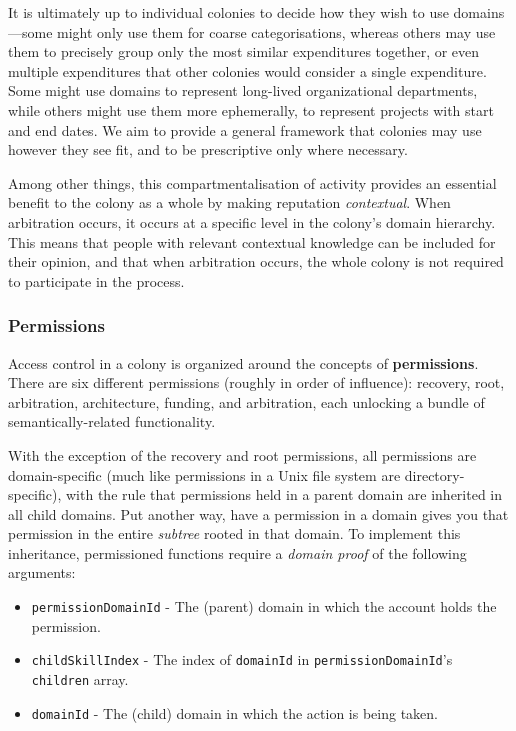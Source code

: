 It is ultimately up to individual colonies to decide how they wish to use domains—some might only use them for coarse categorisations, whereas others may use them to precisely group only the most similar expenditures together, or even multiple expenditures that other colonies would consider a single expenditure. Some might use domains to represent long-lived organizational departments, while others might use them more ephemerally, to represent projects with start and end dates. We aim to provide a general framework that colonies may use however they see fit, and to be prescriptive only where necessary.

Among other things, this compartmentalisation of activity provides an essential benefit to the colony as a whole by making reputation \textit{contextual}. When arbitration occurs, it occurs at a specific level in the colony's domain hierarchy. This means that people with relevant contextual knowledge can be included for their opinion, and that when arbitration occurs, the whole colony is not required to participate in the process.

\subsubsection{Permissions}

Access control in a colony is organized around the concepts of \textbf{permissions}. There are six different permissions (roughly in order of influence): recovery, root, arbitration, architecture, funding, and arbitration, each unlocking a bundle of semantically-related functionality.

With the exception of the recovery and root permissions, all permissions are domain-specific (much like permissions in a Unix file system are directory-specific), with the rule that permissions held in a parent domain are inherited in all child domains. Put another way, have a permission in a domain gives you that permission in the entire \textit{subtree} rooted in that domain. To implement this inheritance, permissioned functions require a \textit{domain proof} of the following arguments:

\begin{itemize}
\item \texttt{permissionDomainId} - The (parent) domain in which the account holds the permission.
\item \texttt{childSkillIndex} - The index of \texttt{domainId} in \texttt{permissionDomainId}'s \texttt{children} array.
\item \texttt{domainId} - The (child) domain in which the action is being taken.
\end{itemize}

